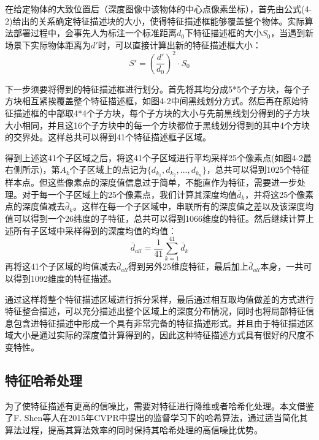在给定物体的大致位置后（深度图像中该物体的中心点像素坐标），首先由公式(4-2)给出的关系确定特征描述块的大小，使得特征描述框能够覆盖整个物体。实际算法部署过程中，会事先人为标注一个标准距离$d_0$下特征描述框的大小$S_0$，当遇到新场景下实际物体距离为$d'$时，可以直接计算出新的特征描述框大小：
\begin{equation}
	S'=\left(\frac{d'}{d_0}\right)^2\cdot S_0
\end{equation}

下一步须要将得到的特征描述框进行划分。首先将其均分成5*5个子方块，每个子方块相互紧挨覆盖整个特征描述框，如图4-2中间黑线划分方式。然后再在原始特征描述框的中部取4*4个子方块，每个子方块的大小与先前黑线划分得到的子方块大小相同，并且这16个子方块中的每一个方块都位于黑线划分得到的其中4个方块的交界处。这样总共可以得到41个特征描述框子区域。

得到上述这41个子区域之后，将这41个子区域进行平均采样25个像素点(如图4-2最右侧所示)，第$A_k$个子区域上的点记为$\{d_{k_1},d_{k_2},...,d_{k_n}\}$，总共可以得到1025个特征样本点。但这些像素点的深度值信息过于简单，不能直作为特征，需要进一步处理。对于每一个子区域上的25个像素点，我们计算其深度均值$\bar{d}_k$，并将这25个像素点的深度值减去$\bar{d}_k$。这样在每一个子区域中，串联所有的深度值之差以及该深度均值可以得到一个26纬度的子特征，总共可以得到1066维度的特征。然后继续计算上述所有子区域中采样得到的深度均值的均值：
\begin{equation}
	\bar{d}_{all}=\frac{1}{41}\sum_{k=1}^{41} \bar{d}_k
\end{equation}
再将这41个子区域的均值减去$\bar{d}_{all}$得到另外25维度特征，最后加上$\bar{d}_{all}$本身，一共可以得到1092维度的特征描述。

通过这样将整个特征描述区域进行拆分采样，最后通过相互取均值做差的方式进行特征整合描述，可以充分描述出整个区域上的深度分布情况，同时也将局部特征信息包含进特征描述中形成一个具有非常完备的特征描述形式。并且由于特征描述区域大小是通过实际的深度值计算得到的，因此这种特征描述方式具有很好的尺度不变特性。

\subsection{特征哈希处理} %

为了使特征描述有更高的信噪比，需要对特征进行降维或者哈希化处理。本文借鉴了F. Shen等人在2015年CVPR中提出的监督学习下的哈希算法\cite{shen2015supervised}，通过适当简化其算法过程，提高其算法效率的同时保持其哈希处理的高信噪比优势。

